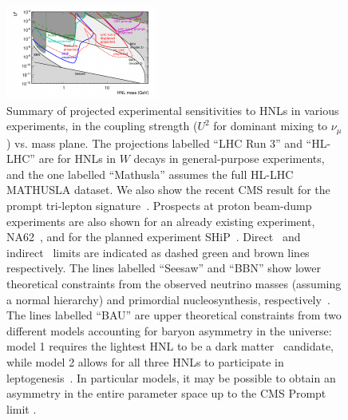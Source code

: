 \begin{figure}[th]
\centering
\includegraphics[width=0.99\linewidth]{plots/BigPicture.pdf}
\caption{Summary of projected experimental sensitivities to HNLs in various experiments, in the coupling strength ($U^2$ for dominant mixing to $\nu_\mu$) vs. mass plane. The projections labelled ``LHC Run 3'' and ``HL-LHC'' are for HNLs in $W$ decays in general-purpose experiments, and the one labelled ``Mathusla'' assumes the full HL-LHC MATHUSLA dataset. We also show the recent CMS result for the prompt tri-lepton signature~\cite{Sirunyan:2018mtv}. Prospects at proton beam-dump experiments are also shown for an already existing experiment, NA62~\cite{Lanfranchi2017}, and for the planned experiment SHiP~\cite{SHiP2015}. Direct~\cite{Bernardi1988,CHARM1986,NuTeV1999,Delphi1997,CMS2015b} and indirect~\cite{MEG2013,Antusch2015} limits are indicated as dashed green and brown lines respectively. The lines labelled ``Seesaw'' and ``BBN'' show lower theoretical constraints from the observed neutrino masses (assuming a normal hierarchy) and primordial nucleosynthesis, respectively~\cite{Canetti2013b}. The lines labelled ``BAU'' are upper theoretical constraints from two different models accounting for baryon asymmetry in the universe: model 1 requires the lightest HNL to be a dark matter~\cite{Canetti2013b} candidate, while model 2 allows for all three HNLs to participate in leptogenesis~\cite{Canetti2014}. In particular models, it may be possible to obtain an asymmetry in the entire parameter space up to the CMS Prompt limit \cite{Abada:2018oly}. }
\label{fig:HNLsensitivity}
\end{figure}

